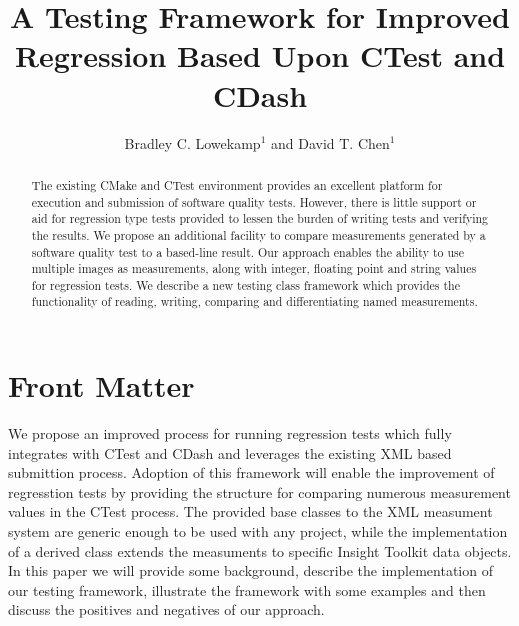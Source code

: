 \documentclass{InsightArticle}
\title{A Testing Framework for Improved Regression Based Upon CTest and CDash}
\author{Bradley C. Lowekamp$^{1}$ and David T. Chen$^{1}$}
\newcommand{\IJhandlerIDnumber}{???}
\begin{document}
%
% 
\IJhandlefooter{\IJhandlerIDnumber}


\ifpdf
\else
\fi


\maketitle


\ifhtml
\chapter*{Front Matter\label{front}}
\fi


\begin{abstract}
\noindent
The existing CMake and CTest environment provides an excellent platform for execution and submission of software quality tests. However, there is little support or aid for regression type tests provided to lessen the burden of writing tests and verifying the results. We propose an additional facility to compare measurements generated by a software quality test to a based-line result. Our approach enables the ability to use multiple images as measurements, along with integer, floating point and string values for regression tests. We describe a new testing class framework which provides the functionality of reading, writing, comparing and differentiating named measurements.
\end{abstract}

\IJhandlenote{\IJhandlerIDnumber}

\tableofcontents

We propose an improved process for running regression tests which fully integrates with CTest and CDash and leverages the existing XML based submittion process. Adoption of this framework will enable the improvement of regresstion tests by providing the structure for comparing numerous measurement values in the CTest process. The provided base classes to the XML measument system are generic enough to be used with any project, while the implementation of a derived class extends the measuments to specific Insight Toolkit data objects. In this paper we will provide some background, describe the implementation of our testing framework, illustrate the framework with some examples and then discuss the positives and negatives of our approach.
\end{document}
